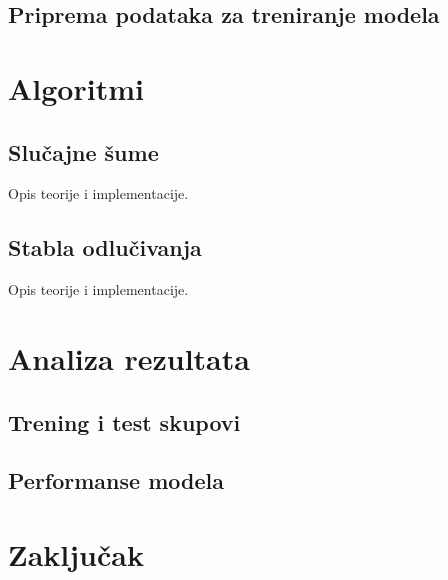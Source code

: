 \documentclass[a4paper,12pt]{article}
\begin{document}
\subsection{Priprema podataka za treniranje modela}



\section{Algoritmi}

\subsection{Slučajne šume}
Opis teorije i implementacije.

\subsection{Stabla odlučivanja}
Opis teorije i implementacije.

\section{Analiza rezultata}


\subsection{Trening i test skupovi}

\subsection{Performanse modela}

\section{Zaključak}


\begin{thebibliography}{9}
\end{thebibliography}
\end{document}
